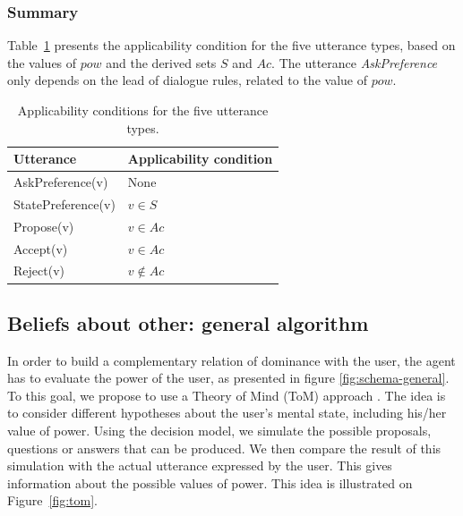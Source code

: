 \documentclass[sigconf]{aamas}  %
\begin{document}
	\subsubsection{Summary}	
	Table~\ref{tab:utt} presents the applicability condition for the five utterance types, based on the values of $pow$ and the derived sets $S$ and $Ac$. The utterance \emph{AskPreference} only depends on the lead of dialogue rules, related to the value of $pow$.
		
		\begin{table}
			\centering
				\caption{Applicability conditions for the five utterance types.}
				\label{tab:utt}
			\begin{tabular}  {|l|l|}
				\hline
				Utterance & Applicability condition \\
				\hline
				AskPreference(v) & None \\
				\hline 
				StatePreference(v) & $v\in S$ \\
				\hline 
				Propose(v) & $v\in Ac$ \\
				\hline
				Accept(v)  & $v\in Ac$ \\
				\hline
				Reject(v) & $v\notin Ac$ \\
				\hline
			\end{tabular}
		\end{table}
	
	\subsection{Beliefs about other: general algorithm}
	
	In order to build a complementary relation of dominance with the user, the agent has to evaluate the power of the user, as presented in figure \ref{fig:schema-general}. To this goal, we propose to use a Theory of Mind (ToM) approach \cite{premack1978does}. The idea is to consider different hypotheses about the user's mental state, including his/her value of power. Using the decision model, we simulate the possible proposals, questions or answers that can be produced. We then compare the result of this simulation with the actual utterance expressed by the user. This gives information about the possible values of power. This idea is illustrated on Figure~\ref{fig:tom}.
		
\end{document}
